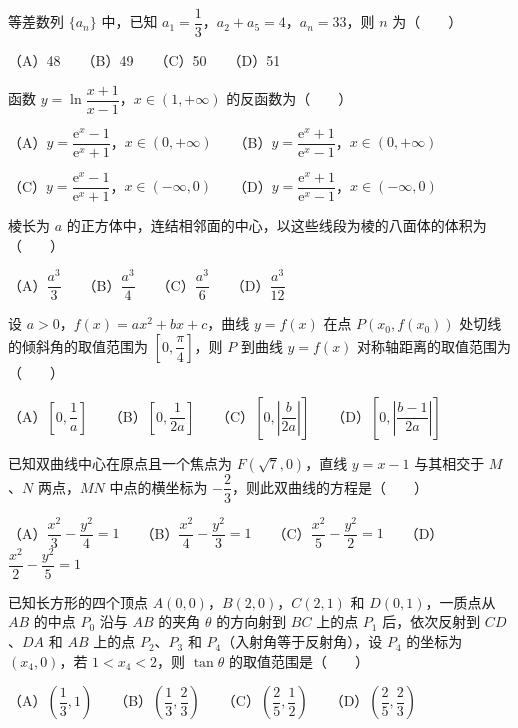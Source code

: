 \begin{question}
等差数列 $\{a_n\}$ 中，已知 $a_1 = \dfrac{1}{3}$，$a_2 + a_5 = 4$，$a_n = 33$，则 $n$ 为\mbox{（　　）}

（A）48　　（B）49　　（C）50　　（D）51

\end{question}
\begin{question}
函数 $y = \ln\dfrac{x+1}{x-1}$，$x \in (1, +\infty)$ 的反函数为\mbox{（　　）}

（A）$y = \dfrac{\mathrm{e}^x - 1}{\mathrm{e}^x + 1}$，$x \in (0, +\infty)$　　（B）$y = \dfrac{\mathrm{e}^x + 1}{\mathrm{e}^x - 1}$，$x \in (0, +\infty)$

（C）$y = \dfrac{\mathrm{e}^x - 1}{\mathrm{e}^x + 1}$，$x \in (-\infty, 0)$　　（D）$y = \dfrac{\mathrm{e}^x + 1}{\mathrm{e}^x - 1}$，$x \in (-\infty, 0)$

\end{question}
\begin{question}
棱长为 $a$ 的正方体中，连结相邻面的中心，以这些线段为棱的八面体的体积为\mbox{（　　）}

（A）$\dfrac{a^3}{3}$　　（B）$\dfrac{a^3}{4}$　　（C）$\dfrac{a^3}{6}$　　（D）$\dfrac{a^3}{12}$

\end{question}
\begin{question}
设 $a > 0$，$f(x) = ax^2 + bx + c$，曲线 $y = f(x)$ 在点 $P(x_0, f(x_0))$ 处切线的倾斜角的取值范围为 $\left[0, \dfrac{\pi}{4}\right]$，则 $P$ 到曲线 $y = f(x)$ 对称轴距离的取值范围为\mbox{（　　）}

（A）$\left[0, \dfrac{1}{a}\right]$　　（B）$\left[0, \dfrac{1}{2a}\right]$　　（C）$\left[0, \left|\dfrac{b}{2a}\right|\right]$　　（D）$\left[0, \left|\dfrac{b-1}{2a}\right|\right]$

\end{question}
\begin{question}
已知双曲线中心在原点且一个焦点为 $F(\sqrt{7}, 0)$，直线 $y = x - 1$ 与其相交于 $M$、$N$ 两点，$MN$ 中点的横坐标为 $-\dfrac{2}{3}$，则此双曲线的方程是\mbox{（　　）}

（A）$\dfrac{x^2}{3} - \dfrac{y^2}{4} = 1$　　（B）$\dfrac{x^2}{4} - \dfrac{y^2}{3} = 1$　　（C）$\dfrac{x^2}{5} - \dfrac{y^2}{2} = 1$　　（D）$\dfrac{x^2}{2} - \dfrac{y^2}{5} = 1$

\end{question}
\begin{question}
已知长方形的四个顶点 $A(0, 0)$，$B(2, 0)$，$C(2, 1)$ 和 $D(0, 1)$，一质点从 $AB$ 的中点 $P_0$ 沿与 $AB$ 的夹角 $\theta$ 的方向射到 $BC$ 上的点 $P_1$ 后，依次反射到 $CD$、$DA$ 和 $AB$ 上的点 $P_2$、$P_3$ 和 $P_4$（入射角等于反射角），设 $P_4$ 的坐标为 $(x_4, 0)$，若 $1 < x_4 < 2$，则 $\tan\theta$ 的取值范围是\mbox{（　　）}

（A）$\left(\dfrac{1}{3}, 1\right)$　　（B）$\left(\dfrac{1}{3}, \dfrac{2}{3}\right)$　　（C）$\left(\dfrac{2}{5}, \dfrac{1}{2}\right)$　　（D）$\left(\dfrac{2}{5}, \dfrac{2}{3}\right)$

\end{question}
